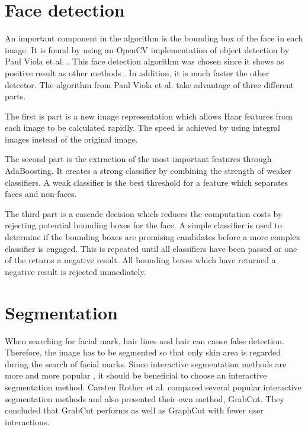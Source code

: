 \section{Face detection}

An important component in the algorithm is the bounding box of the face in each image. It is found by using an OpenCV \cite{opencv} implementation of object detection by Paul Viola et al. \cite{face_detection}. This face detection algorithm was chosen since it shows as positive result as other methods \cite{face_detecion_comp,face_detecion_comp_2}. In addition, it is much faster the other detector. The algorithm from Paul Viola et al. take advantage of three different parts. 

The first is part is a new image representation which allows Haar features from each image to be calculated rapidly. The speed is achieved by using integral images instead of the original image. 

The second part is the extraction of the most important features through AdaBoosting. It creates a strong classifier by combining the strength of weaker classifiers. A weak classifier is the best threshold for a feature which separates faces and non-faces.

The third part is a cascade decision which reduces the computation costs by rejecting potential bounding boxes for the face. A simple classifier is used to determine if the bounding boxes are promising candidates before a more complex classifier is engaged. This is repeated until all classifiers have been passed or one of the returns a negative result. All bounding boxes which have returned a negative result is rejected immediately.  

\section{Segmentation} \label{sec:segmentation} 

When searching for facial mark, hair lines and hair can cause false detection. Therefore, the image has to be segmented so that only skin area is regarded during the search of facial marks. Since interactive segmentation methods are more and more popular \cite{graphcut}, it should be beneficial to choose an interactive segmentation method. Carsten Rother et al.\cite{grabcut} compared several popular interactive segmentation methods and also presented their own method, GrabCut. They concluded that GrabCut performs as well as GraphCut \cite{graphcut} with fewer user interactions.


